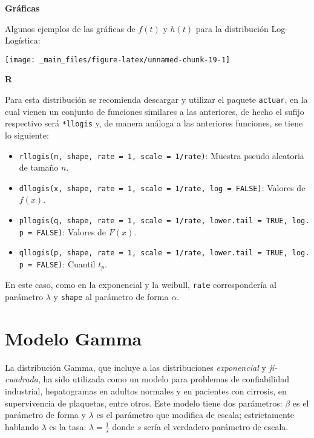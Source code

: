 \documentclass[
  a4paper,
  oneside,
  openany]{book}
\providecommand{\tightlist}{%
  \setlength{\itemsep}{0pt}\setlength{\parskip}{0pt}}
\begin{document}
\textbf{Gráficas}

Algunos ejemplos de las gráficas de \(f(t)\) y \(h(t)\) para la distribución Log-Logística:

\begin{center}\texttt{[image: \_main\_files/figure-latex/unnamed-chunk-19-1]} \end{center}

\textbf{R}

Para esta distribución se recomienda descargar y utilizar el paquete \texttt{actuar}, en la cual vienen un conjunto de funciones similares a las anteriores, de hecho el sufijo respectivo será \texttt{*llogis} y, de manera análoga a las anteriores funciones, se tiene lo siguiente:

\begin{itemize}
\tightlist
\item
  \texttt{rllogis(n,\ shape,\ rate\ =\ 1,\ scale\ =\ 1/rate)}: Muestra pseudo aleatoria de tamaño \(n\).
\item
  \texttt{dllogis(x,\ shape,\ rate\ =\ 1,\ scale\ =\ 1/rate,\ log\ =\ FALSE)}: Valores de \(f(x)\).
\item
  \texttt{pllogis(q,\ shape,\ rate\ =\ 1,\ scale\ =\ 1/rate,\ lower.tail\ =\ TRUE,\ log.p\ =\ FALSE)}: Valores de \(F(x)\).
\item
  \texttt{qllogis(p,\ shape,\ rate\ =\ 1,\ scale\ =\ 1/rate,\ lower.tail\ =\ TRUE,\ log.p\ =\ FALSE)}: Cuantil \(t_p\).
\end{itemize}

En este caso, como en la exponencial y la weibull, \texttt{rate} correspondería al parámetro \(\lambda\) y \texttt{shape} al parámetro de forma \(\alpha\).

\hypertarget{modelo-gamma}{%
\section{Modelo Gamma}\label{modelo-gamma}}

La distribución Gamma, que incluye a las distribuciones \emph{exponencial} y \emph{ji-cuadrada}, ha sido utilizada como un modelo para problemas de confiabilidad industrial, hepatogramas en adultos normales y en pacientes con cirrosis, en supervivencia de plaquetas, entre otros. Este modelo tiene dos parámetros: \(\beta\) es el parámetro de forma y \(\lambda\) es el parámetro que modifica de escala; estrictamente hablando \(\lambda\) es la tasa: \(\lambda =\frac{1}{s}\) donde \(s\) sería el verdadero parámetro de escala.
\end{document}
